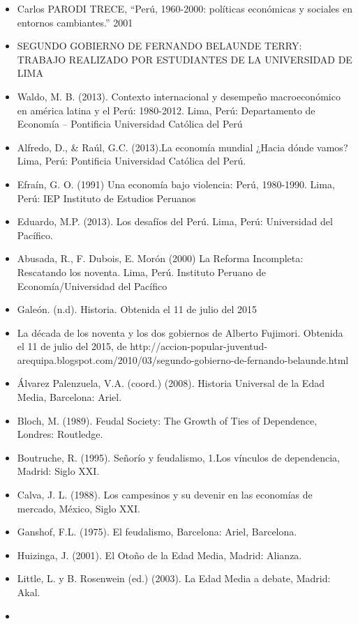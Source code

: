 \documentclass[
  jou,
  floatsintext,
  longtable,
  a4paper,
  nolmodern,
  notxfonts,
  notimes,
  12pt,
  colorlinks=true,linkcolor=blue,citecolor=blue,urlcolor=blue]{apa7}
\begin{document}
\begin{itemize}
\item
  Carlos PARODI TRECE, ``Perú, 1960-2000: políticas económicas y
  sociales en entornos cambiantes.'' 2001
\item
  SEGUNDO GOBIERNO DE FERNANDO BELAUNDE TERRY: TRABAJO REALIZADO POR
  ESTUDIANTES DE LA UNIVERSIDAD DE LIMA
\item
  Waldo, M. B. (2013). Contexto internacional y desempeño macroeconómico
  en américa latina y el Perú: 1980-2012. Lima, Perú: Departamento de
  Economía -- Pontificia Universidad Católica del Perú
\item
  Alfredo, D., \& Raúl, G.C. (2013).La economía mundial ¿Hacia dónde
  vamos? Lima, Perú: Pontificia Universidad Católica del Perú.
\item
  Efraín, G. O. (1991) Una economía bajo violencia: Perú, 1980-1990.
  Lima, Perú: IEP Instituto de Estudios Peruanos
\item
  Eduardo, M.P. (2013). Los desafíos del Perú. Lima, Perú: Universidad
  del Pacífico.
\item
  Abusada, R., F. Dubois, E. Morón (2000) La Reforma Incompleta:
  Rescatando los noventa. Lima, Perú. Instituto Peruano de
  Economía/Universidad del Pacífico
\item
  Galeón. (n.d). Historia. Obtenida el 11 de julio del 2015
\item
  La década de los noventa y los dos gobiernos de Alberto Fujimori.
  Obtenida el 11 de julio del 2015, de
  http://accion-popular-juventud-arequipa.blogspot.com/2010/03/segundo-gobierno-de-fernando-belaunde.html
\item
  Álvarez Palenzuela, V.A. (coord.) (2008). Historia Universal de la
  Edad Media, Barcelona: Ariel.
\item
  Bloch, M. (1989). Feudal Society: The Growth of Ties of Dependence,
  Londres: Routledge.
\item
  Boutruche, R. (1995). Señorío y feudalismo, 1.Los vínculos de
  dependencia, Madrid: Siglo XXI.
\item
  Calva, J. L. (1988). Los campesinos y su devenir en las economías de
  mercado, México, Siglo XXI.
\item
  Ganshof, F.L. (1975). El feudalismo, Barcelona: Ariel, Barcelona.
\item
  Huizinga, J. (2001). El Otoño de la Edad Media, Madrid: Alianza.
\item
  Little, L. y B. Rosenwein (ed.) (2003). La Edad Media a debate,
  Madrid: Akal.
\item

\end{itemize}
\end{document}
